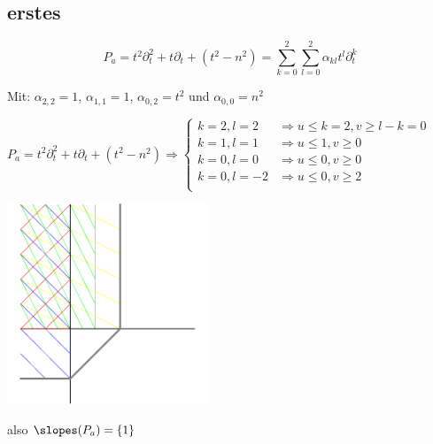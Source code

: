\subsection{erstes}
\[
  P_a=t^2\partial_t^2+t\partial_t+(t^2-n^2)=\sum_{k=0}^2\sum_{l=0}^2
  \alpha_{kl}t^l\partial_t^k
\]

Mit: $\alpha_{2,2}=1$, $\alpha_{1,1}=1$, $\alpha_{0,2}=t^2$ und
$\alpha_{0,0}=n^2$

$
P_a=t^2\partial_t^2+t\partial_t+(t^2-n^2) \Rightarrow 
\begin{cases}
  k=2,l=2 & \Rightarrow u\leq k=2, v\geq l-k=0\\
  k=1,l=1 & \Rightarrow u\leq 1, v\geq 0\\
  k=0,l=0 & \Rightarrow u\leq 0, v\geq 0\\
  k=0,l=-2 & \Rightarrow u\leq 0, v\geq 2\\
\end{cases}
$

\begin{center}
  \includegraphics[width=6cm]{img/a.png}
\end{center}
also $\slopes(P_a)=\{1\}$

